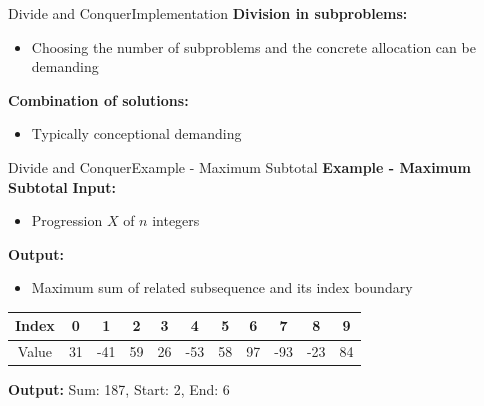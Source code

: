 
\begin{frame}{Divide and Conquer}{Implementation}
  \textbf{Division in subproblems:}
  \begin{itemize}
    \item<2->
      Choosing the number of subproblems and the concrete allocation can be
      demanding
  \end{itemize}
  \vspace{1em}
  \textbf{Combination of solutions:}
  \begin{itemize}
    \item<4->
      Typically conceptional demanding
  \end{itemize}
\end{frame}


\begin{frame}{Divide and Conquer}{Example - Maximum Subtotal}
  \textbf{Example - Maximum Subtotal}
   \textbf{Input:}
  \begin{itemize}
    \item<4->
      Progression {\color{Mittel-Blau}$X$} of {\color{Mittel-Blau}$n$} integers
  \end{itemize}
  \textbf{Output:}
  \begin{itemize}
    \item<6->
      Maximum sum of related subsequence and its index boundary
  \end{itemize}
    \vspace{1em}
    \begin{table}[!t]
      \begin{tabular}{c|c|c|c|c|c|c|c|c|c|c}
        Index & 0 & 1 & 2 & 3 & 4 & 5 & 6 & 7 & 8 & 9\\
        \midrule
        Value & 31 & -41 & 59 & 26 & -53 & 58 & 97 & -93 & -23 & 84
      \end{tabular}
      \end{table}
  \textbf{Output:} Sum: 187, Start: 2, End: 6
\end{frame}



